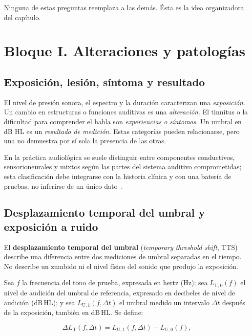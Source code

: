 Ninguna de estas preguntas reemplaza a las demás. Ésta es la idea organizadora
del capítulo.

\section{Bloque I. Alteraciones y patologías}
\label{sec:u8-alteraciones}

\subsection{Exposición, lesión, síntoma y resultado}

El nivel de presión sonora, el espectro y la duración caracterizan una
\emph{exposición}. Un cambio en estructuras o funciones auditivas es una
\emph{alteración}. El tinnitus o la dificultad para comprender el habla son
\emph{experiencias o síntomas}. Un umbral en dB HL es un \emph{resultado de
medición}. Estas categorías pueden relacionarse, pero una no demuestra por sí
sola la presencia de las otras.

En la práctica audiológica se suele distinguir entre componentes
conductivos, sensorioneurales y mixtos según las partes del sistema auditivo
comprometidas; esta clasificación debe integrarse con la historia clínica y
con una batería de pruebas, no inferirse de un único dato~\cite{ashaHearingAdults}.

\subsection{Desplazamiento temporal del umbral y exposición a ruido}
\label{sec:u8-tts}

El \textbf{desplazamiento temporal del umbral} (\emph{temporary threshold
shift}, TTS) describe una diferencia entre dos mediciones de umbral separadas
en el tiempo. No describe un zumbido ni el nivel físico del sonido que produjo
la exposición.

Sea \(f\) la frecuencia del tono de prueba, expresada en hertz
(\(\mathrm{Hz}\)); sea \(L_{\mathrm{U},0}(f)\) el nivel de audición del umbral
de referencia, expresado en decibeles de nivel de audición
(\(\mathrm{dB\,HL}\)); y sea \(L_{\mathrm{U},1}(f,\Delta t)\) el umbral medido
un intervalo \(\Delta t\) después de la exposición, también en
\(\mathrm{dB\,HL}\). Se define:

\begin{equation}
    \Delta L_{\mathrm{T}}(f,\Delta t)
    =
    L_{\mathrm{U},1}(f,\Delta t)-L_{\mathrm{U},0}(f),
    \label{eq:u8-tts}
\end{equation}

